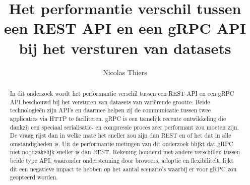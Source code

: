 \documentclass[a0,portrait]{hogent-poster}
\title{Het performantie verschil tussen een REST API en een gRPC API bij het versturen van datasets}
\author{Nicolas Thiers}
\begin{document}
\maketitle

\begin{abstract}
  In dit onderzoek wordt het performantie verschil tussen een REST API en een gRPC API beschouwd bij het versturen van datasets van vari\"erende grootte.
  Beide technologie\"en zijn API's en daarmee helpen zij de communicatie tussen twee applicaties via HTTP te faciliteren. gRPC is een tamelijk recente ontwikkeling die
  dankzij een speciaal serialisatie- en compressie proces zeer performant zou moeten zijn. De vraag rijst dan in welke mate het sneller zou zijn dan REST en of het dat
  in alle omstandigheden is. Uit de performantie metingen van dit onderzoek blijkt dat gRPC niet noodzakelijk sneller is dan REST.
  Rekening houdend met andere verschillen tussen beide type API, waaronder ondersteuning door browsers, adoptie en flexibiliteit, lijkt dit een negatieve impact te
  hebben op het aantal scenario's waarbij er voor gRPC zou geopteerd worden.

\end{abstract}
\end{document}
